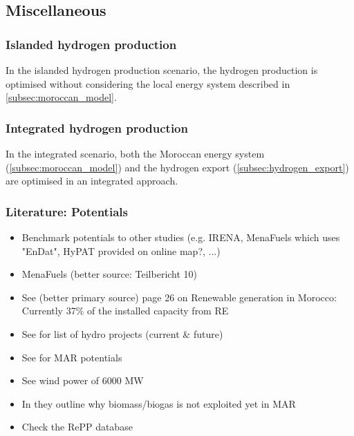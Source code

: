 \subsection{Miscellaneous}

\subsubsection{Islanded hydrogen production}
In the islanded hydrogen production scenario, the hydrogen production is optimised without considering the local energy system described in \ref{subsec:moroccan_model}.

\subsubsection{Integrated hydrogen production}
In the integrated scenario, both the Moroccan energy system (\ref{subsec:moroccan_model}) and the hydrogen export (\ref{subsec:hydrogen_export})
are optimised in an integrated approach.


\subsubsection{Literature: Potentials}
\begin{itemize}
    \item Benchmark potentials to other studies (e.g. IRENA, MenaFuels which uses "EnDat", HyPAT provided on online map?, ...)
    \item MenaFuels \cite[p. 25]{Ersoy2022} (better source: Teilbericht 10)
    \item See \cite{Ersoy2022} (better primary source) page 26 on Renewable generation in Morocco: Currently 37\% of the installed capacity from RE
    \item See \cite[p. 5]{Boulakhbar2020} for list of hydro projects (current \& future)
    \item See \cite[primary 10,13,17]{Boulakhbar2020} for MAR potentials
    \item See \cite[primary 13, 38]{Boulakhbar2020} wind power of 6000 MW
    \item In \cite[p. 6]{Boulakhbar2020} they outline why biomass/biogas is not exploited yet in MAR
    \item Check the RePP database \cite{Peters2023}
\end{itemize}